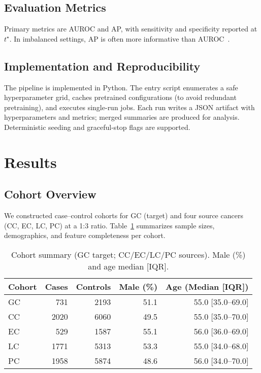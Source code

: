 \documentclass[journal,article,submit,pdftex,moreauthors]{Definitions/mdpi}
\begin{document}
\subsection{Evaluation Metrics}
Primary metrics are AUROC and AP, with sensitivity and specificity reported at $t^\star$. In imbalanced settings, AP is often more informative than AUROC~\citep{Saito2015_PR}.

\subsection{Implementation and Reproducibility}
The pipeline is implemented in Python. The entry script enumerates a safe hyperparameter grid, caches pretrained configurations (to avoid redundant pretraining), and executes single-run jobs. Each run writes a JSON artifact with hyperparameters and metrics; merged summaries are produced for analysis. Deterministic seeding and graceful-stop flags are supported.



\section{Results}


\subsection{Cohort Overview}
We constructed case--control cohorts for GC (target) and four source cancers (CC, EC, LC, PC) at a 1:3 ratio.
Table~\ref{tab:cohort} summarizes sample sizes, demographics, and feature completeness per cohort.

\begin{table}[H]
\caption{Cohort summary (GC target; CC/EC/LC/PC sources). Male (\%) and age median [IQR].}
\label{tab:cohort}
\centering
\begin{tabular}{lrrrr}
\toprule
Cohort & Cases & Controls & Male (\%) & Age (Median [IQR]) \\
\midrule
GC & 731 & 2193 & 51.1 & 55.0 [35.0–69.0] \\
CC & 2020 & 6060 & 49.5 & 55.0 [35.0–70.0] \\
EC & 529 & 1587 & 55.1 & 56.0 [36.0–69.0] \\
LC & 1771 & 5313 & 53.3 & 55.0 [34.0–68.0] \\
PC & 1958 & 5874 & 48.6 & 56.0 [34.0–70.0] \\
\bottomrule
\end{tabular}

\end{table}
\end{document}
